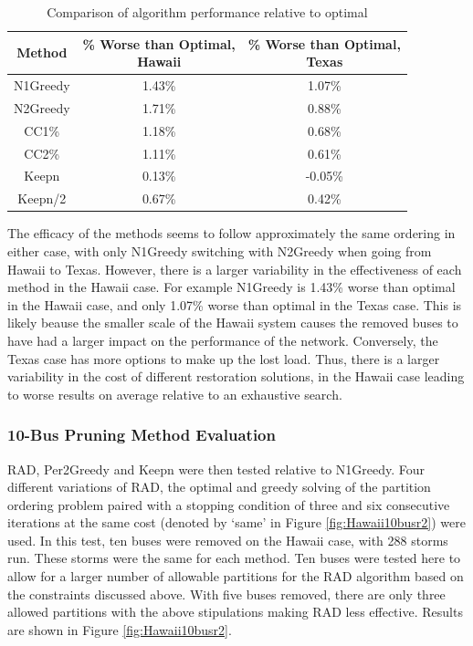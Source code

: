 \documentclass[12pt]{article}
\begin{document}
\begin{table}[ht]
    \centering
    \renewcommand{\arraystretch}{1.2} %
    \begin{tabular}{|c|c|c|}
        \hline
        \textbf{Method} & \makecell{\% Worse than Optimal, \\ Hawaii} & \makecell{\% Worse than Optimal, \\ Texas} \\
        \hline
        N1Greedy & 1.43\% & 1.07\% \\
        \hline
        N2Greedy & 1.71\% & 0.88\% \\
        \hline
        CC1\% & 1.18\% & 0.68\% \\
        \hline
        CC2\% & 1.11\% & 0.61\% \\
        \hline
        Keepn & 0.13\% & -0.05\% \\
        \hline
        Keepn/2 & 0.67\% & 0.42\% \\
        \hline
    \end{tabular}
    \caption{Comparison of algorithm performance relative to optimal}
    \label{tab:r1results}
\end{table}

The efficacy of the methods seems to follow approximately the same ordering in either case, with only N1Greedy switching with N2Greedy when going from Hawaii to Texas. However, there is a larger variability in the effectiveness of each method in the Hawaii case. For example N1Greedy is 1.43\% worse than optimal in the Hawaii case, and only 1.07\% worse than optimal in the Texas case. This is likely beause the smaller scale of the Hawaii system causes the removed buses to have had a larger impact on the performance of the network. Conversely, the Texas case has more options to make up the lost load. Thus, there is a larger variability in the cost of different restoration solutions, in the Hawaii case leading to worse results on average relative to an exhaustive search. \par

\subsubsection{10-Bus Pruning Method Evaluation}
RAD, Per2Greedy and Keepn were then tested relative to N1Greedy. Four different variations of RAD, the optimal and greedy solving of the partition ordering problem paired with a stopping condition of three and six consecutive iterations at the same cost (denoted by `same' in Figure \ref{fig:Hawaii10busr2}) were used. In this test, ten buses were removed on the Hawaii case, with 288 storms run. These storms were the same for each method. Ten buses were tested here to allow for a larger number of allowable partitions for the RAD algorithm based on the constraints discussed above. With five buses removed, there are only three allowed partitions with the above stipulations making RAD less effective. Results are shown in Figure \ref{fig:Hawaii10busr2}.
\end{document}
